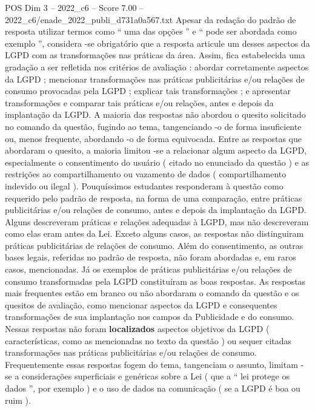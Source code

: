 \begin{textsample}{POS Dim 3 – 2022\_c6 – Score 7.00 – 2022\_c6/enade\_2022\_publi\_d731a0a567.txt}
Apesar da redação do padrão de resposta utilizar termos como “ uma das opções ” e “ pode ser abordada como exemplo ”, considera -se obrigatório que a resposta articule um desses aspectos da LGPD com as transformações nas práticas da área.
Assim, fica estabelecida uma gradação a ser refletida nos critérios de avaliação : abordar corretamente aspectos da LGPD ; mencionar transformações nas práticas publicitárias e/ou relações de consumo provocadas pela LGPD ; explicar tais transformações ; e apresentar transformações e comparar tais práticas e/ou relações, antes e depois da implantação da LGPD.
A maioria das respostas não abordou o quesito solicitado no comando da questão, fugindo ao tema, tangenciando -o de forma insuficiente ou, menos frequente, abordando -o de forma equivocada.
Entre as respostas que abordaram o quesito, a maioria limitou -se a relacionar algum aspecto da LGPD, especialmente o consentimento do usuário ( citado no enunciado da questão ) e as restrições ao compartilhamento ou vazamento de dados ( compartilhamento indevido ou ilegal ).
Pouquíssimos estudantes responderam à questão como requerido pelo padrão de resposta, na forma de uma comparação, entre práticas publicitárias e/ou relações de consumo, antes e depois da implantação da LGPD.
Alguns descreveram práticas e relações adequadas à LGPD, mas não descreveram como elas eram antes da Lei.
Exceto alguns casos, as respostas não distinguiram práticas publicitárias de relações de consumo.
Além do consentimento, as outras bases legais, referidas no padrão de resposta, não foram abordadas e, em raros casos, mencionadas.
Já os exemplos de práticas publicitárias e/ou relações de consumo transformadas pela LGPD constituíram as boas respostas.
As respostas mais frequentes estão em branco ou não abordaram o comando da questão e os quesitos de avaliação, como mencionar aspectos da LGPD e consequentes transformações de sua implantação nos campos da Publicidade e do consumo.
Nessas respostas não foram \textbf{localizados} aspectos objetivos da LGPD ( características, como as mencionadas no texto da questão ) ou sequer citadas transformações nas práticas publicitárias e/ou relações de consumo.
Frequentemente essas respostas fogem do tema, tangenciam o assunto, limitam -se a considerações superficiais e genéricas sobre a Lei ( que a “ lei protege os dados ”, por exemplo ) e o uso de dados na comunicação ( se a LGPD é boa ou ruim ).

\end{textsample}
